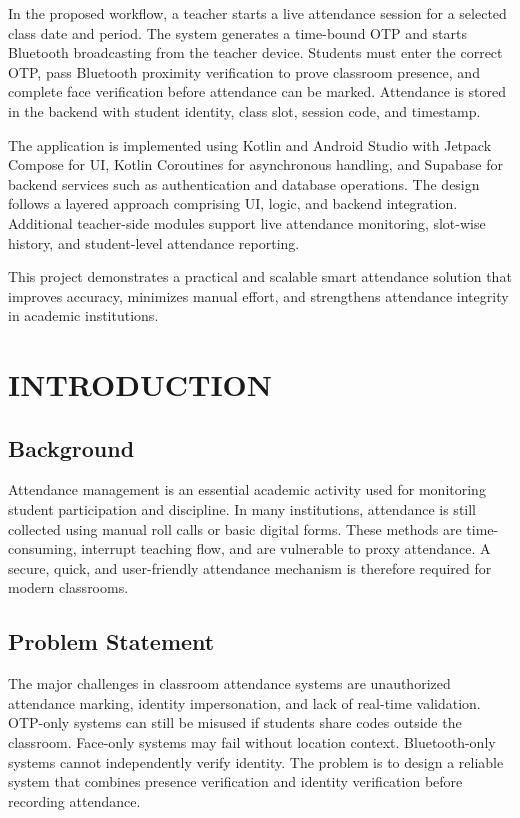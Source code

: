 \documentclass[12pt,a4paper]{report}
\begin{document}
In the proposed workflow, a teacher starts a live attendance session for a selected class date and period. The system generates a time-bound OTP and starts Bluetooth broadcasting from the teacher device. Students must enter the correct OTP, pass Bluetooth proximity verification to prove classroom presence, and complete face verification before attendance can be marked. Attendance is stored in the backend with student identity, class slot, session code, and timestamp.

The application is implemented using Kotlin and Android Studio with Jetpack Compose for UI, Kotlin Coroutines for asynchronous handling, and Supabase for backend services such as authentication and database operations. The design follows a layered approach comprising UI, logic, and backend integration. Additional teacher-side modules support live attendance monitoring, slot-wise history, and student-level attendance reporting.

This project demonstrates a practical and scalable smart attendance solution that improves accuracy, minimizes manual effort, and strengthens attendance integrity in academic institutions.

\clearpage
\tableofcontents
\clearpage
\listoffigures
\clearpage
\listoftables

\clearpage
{}
\setcounter{page}{1}

\chapter{INTRODUCTION}
\section{Background}
Attendance management is an essential academic activity used for monitoring student participation and discipline. In many institutions, attendance is still collected using manual roll calls or basic digital forms. These methods are time-consuming, interrupt teaching flow, and are vulnerable to proxy attendance. A secure, quick, and user-friendly attendance mechanism is therefore required for modern classrooms.

\section{Problem Statement}
The major challenges in classroom attendance systems are unauthorized attendance marking, identity impersonation, and lack of real-time validation. OTP-only systems can still be misused if students share codes outside the classroom. Face-only systems may fail without location context. Bluetooth-only systems cannot independently verify identity. The problem is to design a reliable system that combines presence verification and identity verification before recording attendance.
\end{document}
